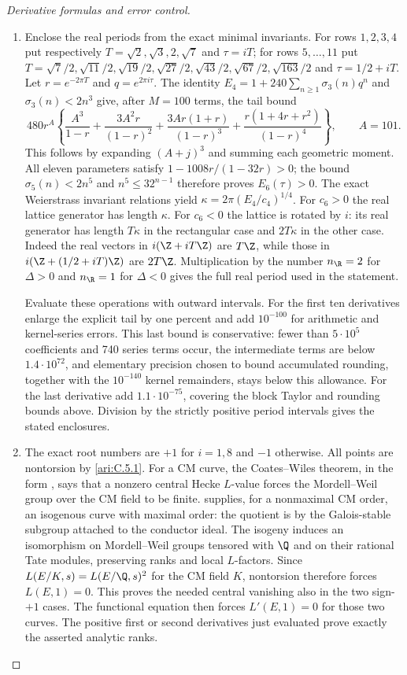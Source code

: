 \begin{proof}[Derivative formulas and error control]
\begin{enumerate}[label=\arabic*.,leftmargin=*]
\item Enclose the real periods from the exact minimal invariants.  For rows $1,2,3,4$
put respectively $T=\sqrt2,\sqrt3,2,\sqrt7$ and $\tau=iT$;
for rows $5,\ldots,11$ put
$T=\sqrt{7}/2,\sqrt{11}/2,\sqrt{19}/2,\sqrt{27}/2,
\sqrt{43}/2,\sqrt{67}/2,\sqrt{163}/2$ and $\tau=1/2+iT$.
Let $r=e^{-2\pi T}$ and $q=e^{2\pi i\tau}$.  The identity
$E_4=1+240\sum_{n\geq1}\sigma_3(n)q^n$ and
$\sigma_3(n)<2n^3$ give, after $M=100$ terms, the tail bound
\[
480r^{A}\left\{
\frac{A^3}{1-r}+\frac{3A^2r}{(1-r)^2}
+\frac{3Ar(1+r)}{(1-r)^3}
+\frac{r(1+4r+r^2)}{(1-r)^4}\right\},\qquad A=101.
\]
This follows by expanding $(A+j)^3$ and summing each geometric
moment.  All eleven parameters satisfy
$1-1008r/(1-32r)>0$; the bound
$\sigma_5(n)<2n^5$ and $n^5\leq32^{n-1}$ therefore proves
$E_6(\tau)>0$.  The exact Weierstrass invariant relations yield
$\kappa=2\pi(E_4/c_4)^{1/4}$.  For $c_6>0$ the real lattice
generator has length $\kappa$.  For $c_6<0$ the lattice is rotated
by $i$: its real generator has length $T\kappa$ in the rectangular
case and $2T\kappa$ in the other case.  Indeed the real vectors in
$i(\Z+iT\Z)$ are $T\Z$, while those in
$i(\Z+(1/2+iT)\Z)$ are $2T\Z$.  Multiplication by the number
$n_{\R}=2$ for $\Delta>0$ and $n_{\R}=1$ for $\Delta<0$
gives the full real period used in the statement.

Evaluate these operations with outward intervals.
For the first ten derivatives enlarge the explicit tail by one
percent and add
$10^{-100}$ for arithmetic and kernel-series errors.  This last
bound is conservative: fewer than $5\cdot10^5$ coefficients and
740 series terms occur, the intermediate terms are below
$1.4\cdot10^{72}$, and elementary precision chosen to bound accumulated rounding,
together with the $10^{-140}$ kernel remainders, stays below
this allowance.
For the last derivative add $1.1\cdot10^{-75}$, covering the
block Taylor and rounding bounds above. Division by the strictly
positive period intervals gives the stated enclosures.

\item The exact root numbers are $+1$ for $i=1,8$ and $-1$ otherwise.
All points are nontorsion by \cref{ari:C.5.1}. For a CM curve,
the Coates--Wiles theorem, in the form
\citet[Theorem~10.1, p.~47]{CrRubin1999}, says that a nonzero central
Hecke $L$-value forces the Mordell--Weil group over the CM field
to be finite. \citet[Proposition~5.3, p.~15]{CrRubin1999} supplies, for a nonmaximal CM order, an isogenous
curve with maximal order: the quotient is by the Galois-stable subgroup attached to the conductor ideal. The isogeny induces an isomorphism on Mordell--Weil groups tensored with $\Q$ and on their rational Tate modules, preserving ranks and local $L$-factors.
Since $L(E/K,s)=L(E/\Q,s)^2$ for the CM field $K$, nontorsion
therefore forces $L(E,1)=0$. This proves the needed central
vanishing also in the two sign-$+1$ cases. The functional equation
then forces $L'(E,1)=0$ for those two curves. The positive first
or second derivatives just evaluated prove exactly the asserted
analytic ranks.
\end{enumerate}

\end{proof}